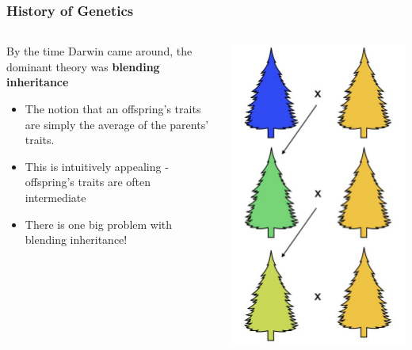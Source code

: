 \documentclass{beamer}
\begin{document}
\begin{frame}
	\frametitle{History of Genetics}
	
	\begin{columns}[T]
		\begin{column}{.6\textwidth}
			By the time Darwin came around, the dominant theory was \textbf{blending inheritance}
		
			\vspace{10pt}
			\begin{itemize}
				\item The notion that an offspring's traits are simply the average of the parents' traits. 
				\item This is intuitively appealing - offspring's traits are often intermediate 
				\item There is one big problem with blending inheritance!
			\end{itemize}
		\end{column}
		\begin{column}{.3\textwidth}
				\centering
			\includegraphics[keepaspectratio, width  = 1.1\textwidth]{img/blending}
		\end{column}
	\end{columns}
	


\end{frame}
\end{document}
